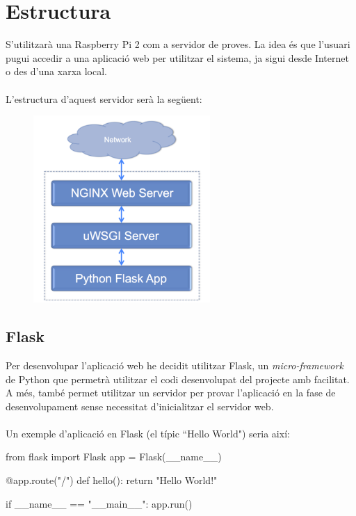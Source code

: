\label{sec:Servidor}

\section{Estructura}
	S'utilitzarà una Raspberry Pi 2 com a servidor de proves. La idea és que l'usuari pugui accedir a una aplicació web per utilitzar el sistema, ja sigui desde Internet o des d'una xarxa local.\\\\
	L'estructura d'aquest servidor serà la següent:\\
	\begin{figure}[H]
		\centering
		\includegraphics[width=0.6\textwidth]{images/server}
	\end{figure}
	\subsection{Flask}
		Per desenvolupar l'aplicació web he decidit utilitzar Flask\cite{Flask}, un \textit{micro-framework} de Python que permetrà utilitzar el codi desenvolupat del projecte amb facilitat.
		A més, també permet utilitzar un servidor per provar l'aplicació en la fase de desenvolupament sense necessitat d'inicialitzar el servidor web.\\\\
		Un exemple d'aplicació en Flask (el típic ``Hello World") seria així:\\
		\begin{python}
from flask import Flask
app = Flask(__name__)

@app.route("/")
def hello():
	return "Hello World!"

if __name__ == "__main__":
	app.run()
		\end{python}
